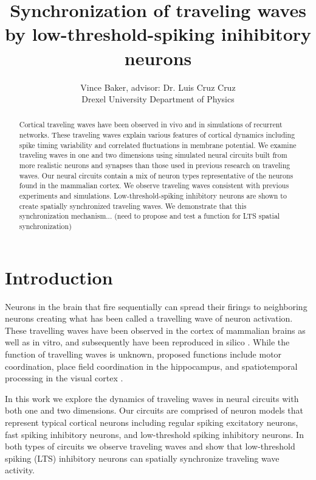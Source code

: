 \documentclass[a4paper,11pt]{article}
\title{Synchronization of traveling waves by low-threshold-spiking inihibitory neurons}
\author{Vince Baker, advisor: Dr. Luis Cruz Cruz\\ Drexel University Department of Physics}
\begin{document}
\maketitle

\begin{abstract}
Cortical traveling waves have been observed in vivo and in simulations of recurrent networks.
These traveling waves explain various features of cortical dynamics including spike timing variability and correlated fluctuations in membrane potential.
We examine traveling waves in one and two dimensions using simulated neural circuits built from more realistic neurons and synapses than those used in previous research on traveling waves.
Our neural circuits contain a mix of neuron types representative of the neurons found in the mammalian cortex.
We observe traveling waves consistent with previous experiments and simulations.
Low-threshold-spiking inhibitory neurons are shown to create spatially synchronized traveling waves.
We demonstrate that this synchronization mechanism... (need to propose and test a function for LTS spatial synchronization)
\end{abstract}

\section{Introduction} 
Neurons in the brain that fire sequentially can spread their firings to neighboring neurons creating what has been called a travelling wave of neuron activation. 
These travelling waves have been observed in the cortex of mammalian brains as well as in vitro, and subsequently have been reproduced in silico \cite{keane2015}. 
While the function of travelling waves is unknown, proposed functions include motor coordination, place field coordination in the hippocampus, and spatiotemporal processing in the visual cortex \cite{muller2018}. 

In this work we explore the dynamics of traveling waves in neural circuits with both one and two dimensions.
Our circuits are comprised of neuron models that represent typical cortical neurons including regular spiking excitatory neurons, fast spiking inhibitory neurons, and low-threshold spiking inhibitory neurons.
In both types of circuits we observe traveling waves and show that low-threshold spiking (LTS) inhibitory neurons can spatially synchronize traveling wave activity.
\end{document}
